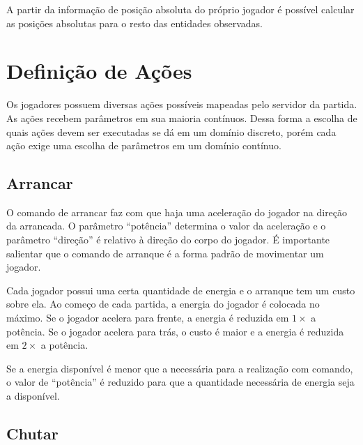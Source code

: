 \par A partir da informação de posição absoluta do próprio jogador é possível calcular as posições absolutas para o resto das entidades observadas.



\section{Definição de Ações}

\par Os jogadores possuem diversas ações possíveis mapeadas pelo servidor da partida. As ações recebem parâmetros em sua maioria contínuos. Dessa forma a escolha de quais ações devem ser executadas se dá em um domínio discreto, porém cada ação exige uma escolha de parâmetros em um domínio contínuo.

\subsection{Arrancar}
\label{sec:dash}

O comando de arrancar faz com que haja uma aceleração do jogador na direção da arrancada. O parâmetro ``potência'' determina o valor da aceleração e o parâmetro ``direção'' é relativo à direção do corpo do jogador. É importante salientar que o comando de arranque é a forma padrão de movimentar um jogador.

Cada jogador possui uma certa quantidade de energia e o arranque tem um custo sobre ela. Ao começo de cada partida, a energia do jogador é colocada no máximo. Se o jogador acelera para frente, a energia é reduzida em $1\times$ a potência. Se o jogador acelera para trás, o custo é maior e a energia é reduzida em $2\times$ a potência.

Se a energia disponível é menor que a necessária para a realização com comando, o valor de ``potência'' é reduzido para que a quantidade necessária de energia seja a disponível.

\subsection{Chutar}


